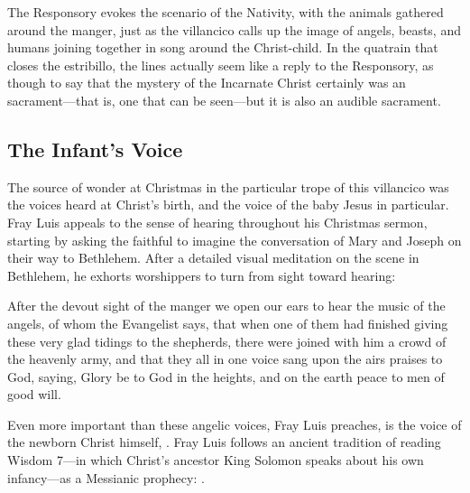 The Responsory evokes the scenario of the Nativity, with the animals gathered
around the manger, just as the villancico calls up the image of angels, beasts,
and humans joining together in song around the Christ-child.
In the quatrain that closes the estribillo, the lines  actually seem like a reply to the Responsory,
as though to say that the mystery of the Incarnate Christ certainly was an
 sacrament---that is, one that can be seen---but it is also
an audible sacrament.

\subsection{The Infant's Voice}

The source of wonder at Christmas in the particular trope of this villancico was
the voices heard at Christ's birth, and the voice of the baby Jesus in
particular.
Fray Luis appeals to the sense of hearing throughout his Christmas sermon,
starting by asking the faithful to imagine the conversation of Mary and Joseph
on their way to Bethlehem.
After a detailed visual meditation on the scene in Bethlehem, he exhorts
worshippers to turn from sight toward hearing:
\begin{quoting}
    After the devout sight of the manger we open our ears to hear the music of
    the angels, of whom the Evangelist says, that when one of them had finished
    giving these very glad tidings to the shepherds, there were joined with him
    a crowd of the heavenly army, and that they all in one voice sang upon the
    airs praises to God, saying, Glory be to God in the heights, and on the
    earth peace to men of good will.%
        \Autocite[40]{LuisdeGranada:Xmas}
\end{quoting}
Even more important than these angelic voices, Fray Luis preaches, is the voice
of the newborn Christ himself, .
Fray Luis follows an ancient tradition of reading Wisdom 7---in which Christ's
ancestor King Solomon speaks about his own infancy---as a Messianic prophecy:
.%
    \Autocites[37--38]{LuisdeGranada:Xmas}
    [Cf.][670, on .]{Lapide:Gospels19C}

